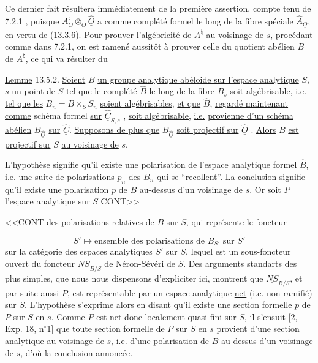 Ce dernier fait résultera immédiatement de la première assertion, compte tenu de 7.2.1 , puisque $A^\natural_{\underline{O}} \otimes_{\underline{O}} \hat{\underline{O}}$ a comme complété formel le long de la fibre spéciale $\hat{A}_{\underline{O}}$, en vertu de (13.3.6). Pour prouver l'algébricité de $A^\natural$ au voisinage de $s$, procédant comme dans 7.2.1, on est ramené aussitôt à prouver celle du quotient abélien $B$ de $A^\natural$, ce qui va résulter du

\underline{Lemme} 13.5.2. \underline{Soient} $B$ \underline{un groupe analytique abéloide sur l'espace analytique} $S$, $s$ \underline{un point de} $S$ \underline{tel que le complété} $\hat{B}$ \underline{le long de la fibre} $B_s$ \underline{soit algébrisable}, \underline{i.e.} \underline{tel que les} $B_n = B \times_S S_n$ \underline{soient algébrisables}, \underline{et que} $\hat{B}$, \underline{regardé maintenant comme} schéma formel \underline{sur} $\hat{\underline{C}}_{S,s}$ , \underline{soit algébrisable}, \underline{i.e.} \underline{provienne d'un schéma abélien} $B_{\hat{\underline{O}}}$ \underline{sur} $\hat{\underline{C}}$. \underline{Supposons de plus que} $B_{\hat{\underline{O}}}$ \underline{soit projectif sur} $\hat{\underline{O}}$ . \underline{Alors} $B$ \underline{est projectif sur} $S$ \underline{au voisinage de} $s$.

L'hypothèse signifie qu'il existe une polarisation de l'espace analytique formel $\hat{B}$, i.e. une suite de polarisations $p_n$ des $B_n$ qui se ``recollent''. La conclusion signifie qu'il existe une polarisation $p$ de $B$ au-dessus d'un voisinage de $s$. Or soit $P$ l'espace analytique sur $S$ CONT>>



<<CONT des polarisations relatives de $B$ sur $S$, qui représente le foncteur

\begin{equation*}
S' \longmapsto \text{ensemble des polarisations de } B_{S'} \text{ sur } S'
\end{equation*}
sur la catégorie des espaces analytiques $S'$ sur $S$, lequel est un sous-foncteur ouvert du foncteur $\underline{NS}_{B/S}$ de Néron-Sévéri de $S$. Des arguments standarts des plus simples, que nous nous dispensons d'expliciter ici, montrent que $\underline{NS}_{B/S}$, et par suite aussi $P$, est représentable par un espace analytique \underline{net} (i.e. non ramifié) sur $S$. L'hypothèse s'exprime alors en disant qu'il existe une section \underline{formelle} $p$ de $P$ sur $S$ en $s$. Comme $P$ est net donc localement quasi-fini sur $S$, il s'ensuit [2, Exp. 18, n$^{\circ}$1] que toute section formelle de $P$ sur $S$ en $s$ provient d'une section analytique au voisinage de $s$, i.e. d'une polarisation de $B$ au-dessus d'un voisinage de $s$, d'où la conclusion annoncée.


